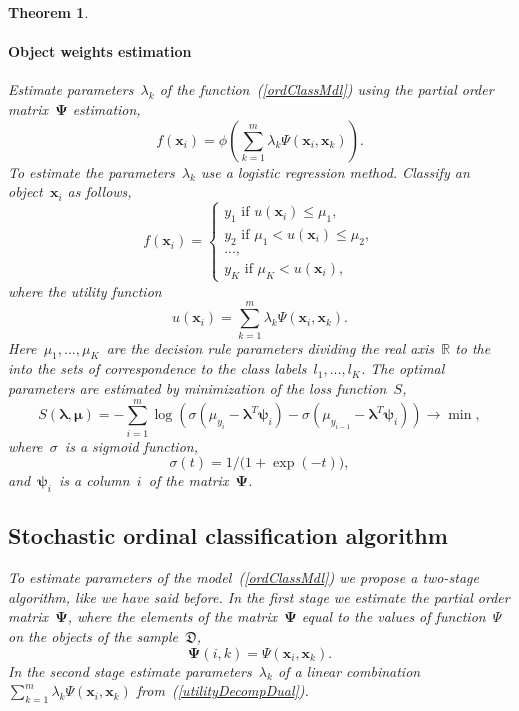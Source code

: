 \documentclass[12pt,preprint]{elsarticle}
\newcommand{\blambda}{\boldsymbol{\lambda}}
\newcommand{\bx}{\mathbf{x}}
\newcommand{\bPsi}{\boldsymbol{\Psi}}
\newcommand{\bpsi}{\boldsymbol{\psi}}
\newtheorem{Theorem}{Theorem}
\begin{document}
\begin{Theorem}
\paragraph{Object weights estimation}
Estimate parameters~$\lambda_k$ of the function~(\ref{ordClassMdl}) using the partial order matrix~$\bPsi$ estimation,
\[
f(\bx_i) = \phi\left(\sum\limits_{k=1}^m \lambda_{k} \Psi(\bx_i, \bx_k)\right).
\]
To estimate the parameters~$\lambda_k$ use a logistic regression method. Classify an object~$\bx_i$ as follows,
\[
f(\bx_i)=
\begin{cases}
y_1\text{ if } u(\bx_i) \leq \mu_1, \\
y_2\text{ if } \mu_1 < u(\bx_i) \leq \mu_2, \\
..., \\
y_K\text{ if } \mu_K < u(\bx_i),
\end{cases}
\]
where the utility function
\[
u(\bx_i)=\sum\limits_{k=1}^m \lambda_{k} \Psi(\bx_i, \bx_k).
\]
Here~$\mu_1,...,\mu_K$~are the decision rule parameters dividing the real axis~$\mathbb{R}$ to the into the sets of correspondence to the class labels~$l_1,...,l_K$. The optimal parameters are estimated by minimization of the loss function~$S$,
\[
S(\blambda, \boldsymbol{\mu})=-\sum\limits_{i=1}^m \log\left(\sigma(\mu_{y_i}-\blambda^T \bpsi_i) - \sigma(\mu_{y_{i-1}} - \blambda^T \bpsi_i)\right)\rightarrow \min,
\]
where~$\sigma$~is a sigmoid function,
\[
\sigma(t)=1/\bigl(1 + \exp{(-t)}\bigr),
\]
and~$\bpsi_i$~is a column~$i$~of the matrix~$\bPsi$.

\subsection{Stochastic ordinal classification algorithm}

To estimate parameters of the model~(\ref{ordClassMdl}) we propose a two-stage algorithm, like we have said before. In the first stage we estimate the partial order matrix~$\bPsi$, where the elements of the matrix~$\bPsi$ equal to the values of function~$\Psi$ on the objects of the sample~$\mathfrak{D}$,
\[
\bPsi(i,k) = \Psi(\bx_i,\bx_k).
\]
In the second stage estimate parameters~$\lambda_k$ of a linear combination~$\sum\limits_{k=1}^m \lambda_{k} \Psi(\bx_i, \bx_k)$ from~(\ref{utilityDecompDual}).

\end{Theorem}
\end{document}

